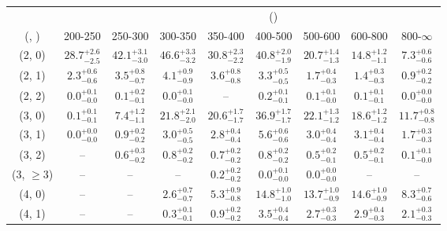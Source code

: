 \begin{table}[h!]
\tiny
\centering
{}
\begin{tabular}
{ccccccccc}
	\hline\hline
&	& \multicolumn{8}{c}{\scalht (\gev)} \\ 
	 (\njet,  \nb) & 200-250 & 250-300 & 300-350 & 350-400 & 400-500 & 500-600 & 600-800 & 800-$\infty$ \\ [0.8ex] 
\hline
	(2, 0) & $28.7^{+ 2.6 }_{- 2.5 }$ & $42.1^{+ 3.1 }_{- 3.0 }$ & $46.6^{+ 3.3 }_{- 3.2 }$ & $30.8^{+ 2.3 }_{- 2.2 }$ & $40.8^{+ 2.0 }_{- 1.9 }$ & $20.7^{+ 1.4 }_{- 1.3 }$ & $14.8^{+ 1.2 }_{- 1.1 }$ & $7.3^{+ 0.6 }_{- 0.6 }$ \\[0.5ex] 
	(2, 1) & $2.3^{+ 0.6 }_{- 0.6 }$ & $3.5^{+ 0.8 }_{- 0.7 }$ & $4.1^{+ 0.9 }_{- 0.9 }$ & $3.6^{+ 0.8 }_{- 0.8 }$ & $3.3^{+ 0.5 }_{- 0.5 }$ & $1.7^{+ 0.4 }_{- 0.3 }$ & $1.4^{+ 0.3 }_{- 0.3 }$ & $0.9^{+ 0.2 }_{- 0.2 }$ \\[0.5ex] 
	(2, 2) & $0.0^{+ 0.1 }_{- 0.0 }$ & $0.1^{+ 0.2 }_{- 0.1 }$ & $0.0^{+ 0.1 }_{- 0.0 }$ & -- & $0.2^{+ 0.1 }_{- 0.1 }$ & $0.1^{+ 0.1 }_{- 0.0 }$ & $0.1^{+ 0.1 }_{- 0.1 }$ & $0.0^{+ 0.0 }_{- 0.0 }$ \\[0.5ex] 
	(3, 0) & $0.1^{+ 0.1 }_{- 0.1 }$ & $7.4^{+ 1.2 }_{- 1.1 }$ & $21.8^{+ 2.1 }_{- 2.0 }$ & $20.6^{+ 1.7 }_{- 1.7 }$ & $36.9^{+ 1.7 }_{- 1.7 }$ & $22.1^{+ 1.3 }_{- 1.2 }$ & $18.6^{+ 1.2 }_{- 1.2 }$ & $11.7^{+ 0.8 }_{- 0.8 }$ \\[0.5ex] 
	(3, 1) & $0.0^{+ 0.0 }_{- 0.0 }$ & $0.9^{+ 0.2 }_{- 0.2 }$ & $3.0^{+ 0.5 }_{- 0.5 }$ & $2.8^{+ 0.4 }_{- 0.4 }$ & $5.6^{+ 0.6 }_{- 0.6 }$ & $3.0^{+ 0.4 }_{- 0.4 }$ & $3.1^{+ 0.4 }_{- 0.4 }$ & $1.7^{+ 0.3 }_{- 0.3 }$ \\[0.5ex] 
	(3, 2) & -- & $0.6^{+ 0.3 }_{- 0.2 }$ & $0.8^{+ 0.2 }_{- 0.2 }$ & $0.7^{+ 0.2 }_{- 0.2 }$ & $0.8^{+ 0.2 }_{- 0.2 }$ & $0.5^{+ 0.2 }_{- 0.1 }$ & $0.5^{+ 0.2 }_{- 0.1 }$ & $0.1^{+ 0.1 }_{- 0.0 }$ \\[0.5ex] 
	(3, $\ge3$) & -- & -- & -- & $0.2^{+ 0.2 }_{- 0.2 }$ & $0.0^{+ 0.1 }_{- 0.0 }$ & $0.0^{+ 0.0 }_{- 0.0 }$ & -- & -- \\[0.5ex] 
	(4, 0) & -- & -- & $2.6^{+ 0.7 }_{- 0.7 }$ & $5.3^{+ 0.9 }_{- 0.8 }$ & $14.8^{+ 1.0 }_{- 1.0 }$ & $13.7^{+ 1.0 }_{- 0.9 }$ & $14.6^{+ 1.0 }_{- 0.9 }$ & $8.3^{+ 0.7 }_{- 0.6 }$ \\[0.5ex] 
	(4, 1) & -- & -- & $0.3^{+ 0.1 }_{- 0.1 }$ & $0.9^{+ 0.2 }_{- 0.2 }$ & $3.5^{+ 0.4 }_{- 0.4 }$ & $2.7^{+ 0.3 }_{- 0.3 }$ & $2.9^{+ 0.4 }_{- 0.3 }$ & $2.1^{+ 0.3 }_{- 0.3 }$ \\[0.5ex] 

\end{tabular}
\end{table}
